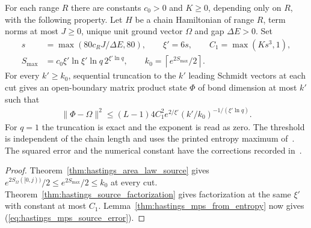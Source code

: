 \begin{theorem}
    \label{thm:hastings_mps_source}
    \leanok
    For each range $R$ there are constants $c_0>0$ and $K\ge0$, depending
    only on $R$, with the following property. Let $H$ be a chain Hamiltonian
    of range $R$, term norms at most $J\ge0$, unique unit ground vector
    $\Omega$ and gap $\Delta E>0$. Set
    \begin{align}
        s        & =\max(80c_RJ/\Delta E,80),\qquad \xi'=6s,
        \qquad C_1=\max(Ks^3,1),
        \label{eq:hastings_mps_source_parameters}            \\
        S_{\max} & =c_0\xi'\ln\xi'\ln q\,2^{\xi'\ln q},
        \qquad k_0=\left\lceil e^{2S_{\max}}/2\right\rceil.
        \label{eq:hastings_mps_source_threshold}
    \end{align}
    For every $k'\ge k_0$, sequential truncation to the $k'$ leading
    Schmidt vectors at each cut gives an open-boundary matrix product
    state $\Phi$ of bond dimension at most $k'$ such that
    \begin{align}
        \|\Phi-\Omega\|^2\le (L-1)4C_1^2 e^{2/\xi'}
        (k'/k_0)^{-1/(\xi'\ln q)}.
        \label{eq:hastings_mps_source_error}
    \end{align}
    For $q=1$ the truncation is exact and the exponent is read as zero.
    The threshold is independent of the chain length and uses the printed
    entropy maximum of~\cite[lines 130--144 and 505--557]{Hastings2007AreaLaw}.
    The squared error and the numerical constant have the corrections
    recorded in~\cite{gap:hastings07_mps_error_measure,
        gap:hastings07_schmidt_tail_constant}.
\end{theorem}
\begin{proof}\leanok
    Theorem~\ref{thm:hastings_area_law_source} gives
    $e^{2S_\Omega([0,j))}/2\le e^{2S_{\max}}/2\le k_0$ at every cut.
    Theorem~\ref{thm:hastings_source_factorization} gives factorization at
    the same $\xi'$ with constant at most $C_1$.
    Lemma~\ref{thm:hastings_mps_from_entropy} now gives
    (\ref{eq:hastings_mps_source_error}).
\end{proof}
